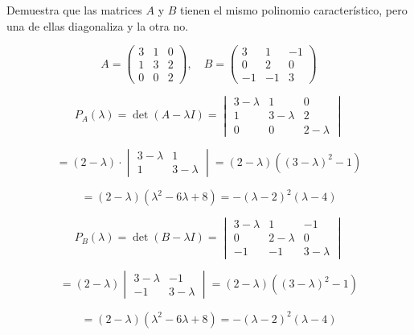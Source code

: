 \documentclass[12pt]{article}
\begin{document}
	\begin{ejercicio}[2 puntos]
		Demuestra que las matrices $A$ y $B$ tienen el mismo polinomio característico, pero una de ellas diagonaliza y la otra no.
		
		\[
		A = \begin{pmatrix}
			3 & 1 & 0 \\
			1 & 3 & 2 \\
			0 & 0 & 2
		\end{pmatrix}, \quad
		B = \begin{pmatrix}
			3 & 1 & -1 \\
			0 & 2 & 0 \\
			-1 & -1 & 3
		\end{pmatrix}
		\]
		
		
		\[
		P_A(\lambda) = \det(A - \lambda I) =
		\begin{vmatrix}
			3 - \lambda & 1 & 0 \\
			1 & 3 - \lambda & 2 \\
			0 & 0 & 2 - \lambda
		\end{vmatrix}
		\]
		
		\[
		= (2 - \lambda) \cdot \begin{vmatrix}
			3 - \lambda & 1 \\
			1 & 3 - \lambda
		\end{vmatrix}
		= (2 - \lambda) \left((3 - \lambda)^2 - 1\right)
		\]
		
		\[
		= (2 - \lambda)\left(\lambda^2 - 6\lambda + 8\right)
		= -(\lambda - 2)^2(\lambda - 4)
		\]
		
		
		\[
		P_B(\lambda) = \det(B - \lambda I) =
		\begin{vmatrix}
			3 - \lambda & 1 & -1 \\
			0 & 2 - \lambda & 0 \\
			-1 & -1 & 3 - \lambda
		\end{vmatrix}
		\]
		
		\[
		= (2 - \lambda)
		\begin{vmatrix}
			3 - \lambda & -1 \\
			-1 & 3 - \lambda
		\end{vmatrix}
		= (2 - \lambda)\left((3 - \lambda)^2 - 1\right)
		\]
		
		\[
		= (2 - \lambda)(\lambda^2 - 6\lambda + 8)
		= -(\lambda - 2)^2(\lambda - 4)
		\]
		

\end{ejercicio}
\end{document}
